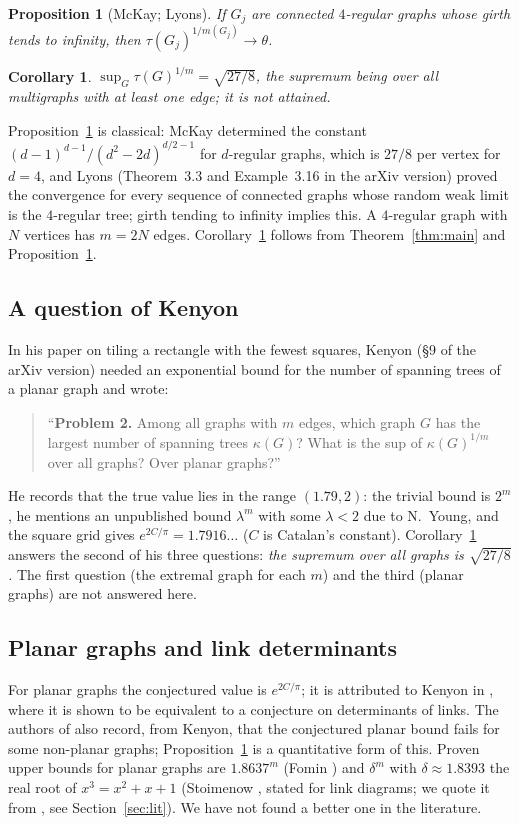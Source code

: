 \documentclass[11pt]{amsart}
\theoremstyle{plain}
\newtheorem{proposition}[theorem]{Proposition}
\newtheorem{corollary}[theorem]{Corollary}
\theoremstyle{remark}
\newcommand{\tht}{\theta}
\begin{document}
\begin{proposition}[McKay; Lyons]\label{prop:sharp}
If $G_j$ are connected $4$-regular graphs whose girth tends to infinity, then $\tau(G_j)^{1/m(G_j)}\to\tht$.
\end{proposition}

\begin{corollary}\label{cor:sup}
$\sup_G\tau(G)^{1/m}=\sqrt{27/8}$, the supremum being over all multigraphs with at least one edge; it is not attained.
\end{corollary}

Proposition~\ref{prop:sharp} is classical: McKay \cite{McKay} determined the constant $(d-1)^{d-1}/(d^2-2d)^{d/2-1}$
for $d$-regular graphs, which is $27/8$ per vertex for $d=4$, and Lyons \cite{Lyons} (Theorem~3.3 and
Example~3.16 in the arXiv version) proved the convergence for every sequence of connected graphs whose random weak
limit is the $4$-regular tree; girth tending to infinity implies this. A $4$-regular graph with $N$ vertices has
$m=2N$ edges. Corollary~\ref{cor:sup} follows from Theorem~\ref{thm:main} and Proposition~\ref{prop:sharp}.

\subsection*{A question of Kenyon}
In his paper on tiling a rectangle with the fewest squares, Kenyon \cite{Kenyon} (\S9 of the arXiv version) needed
an exponential bound
for the number of spanning trees of a planar graph and wrote:
\begin{quote}
``\textbf{Problem 2.} Among all graphs with $m$ edges, which graph $G$ has the largest number of spanning trees
$\kappa(G)$? What is the sup of $\kappa(G)^{1/m}$ over all graphs? Over planar graphs?''
\end{quote}
He records that the true value lies in the range $(1.79,2)$: the trivial bound is $2^m$, he mentions an unpublished
bound $\lambda^m$ with some $\lambda<2$ due to N.~Young, and the square grid gives $e^{2C/\pi}=1.7916\ldots$ ($C$ is
Catalan's constant). Corollary~\ref{cor:sup} answers the second of his three questions: \emph{the supremum over
all graphs is $\sqrt{27/8}$.} The first question (the extremal graph for each $m$) and the third (planar graphs) are not
answered here.

\subsection*{Planar graphs and link determinants}
For planar graphs the conjectured value is $e^{2C/\pi}$; it is attributed to Kenyon in
\cite[Conjecture~2.3]{CKP}, where it is shown to be equivalent to a conjecture on determinants of links. The
authors of \cite{CKP} also record, from Kenyon, that the conjectured planar bound fails for some non-planar
graphs; Proposition~\ref{prop:sharp} is a quantitative form of this. Proven upper bounds for planar graphs are
$1.8637^m$ (Fomin \cite{Fomin}) and $\delta^m$ with $\delta\approx1.8393$ the real root of $x^3=x^2+x+1$
(Stoimenow \cite{Stoimenow}, stated for link diagrams; we quote it from \cite{CKP,GJKLZ}, see
Section~\ref{sec:lit}). We have not found a better one in the literature.
\end{document}
